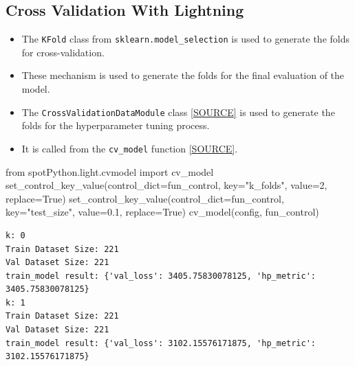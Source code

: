 \documentclass[
  letterpaper,
  DIV=11,
  numbers=noendperiod]{scrreprt}
\newenvironment{Shaded}{\begin{snugshade}}{\end{snugshade}}
\newcommand{\DecValTok}[1]{\textcolor[rgb]{0.68,0.00,0.00}{#1}}
\newcommand{\FloatTok}[1]{\textcolor[rgb]{0.68,0.00,0.00}{#1}}
\newcommand{\ImportTok}[1]{\textcolor[rgb]{0.00,0.46,0.62}{#1}}
\newcommand{\NormalTok}[1]{\textcolor[rgb]{0.00,0.23,0.31}{#1}}
\newcommand{\OperatorTok}[1]{\textcolor[rgb]{0.37,0.37,0.37}{#1}}
\newcommand{\StringTok}[1]{\textcolor[rgb]{0.13,0.47,0.30}{#1}}
\newcommand{\VariableTok}[1]{\textcolor[rgb]{0.07,0.07,0.07}{#1}}
\providecommand{\tightlist}{%
  \setlength{\itemsep}{0pt}\setlength{\parskip}{0pt}}\usepackage{longtable,booktabs,array}
\begin{document}
\subsection{Cross Validation With
Lightning}\label{cross-validation-with-lightning-1}

\begin{itemize}
\tightlist
\item
  The \texttt{KFold} class from \texttt{sklearn.model\_selection} is
  used to generate the folds for cross-validation.
\item
  These mechanism is used to generate the folds for the final evaluation
  of the model.
\item
  The \texttt{CrossValidationDataModule} class
  \href{https://github.com/sequential-parameter-optimization/spotPython/blob/main/src/spotPython/data/lightcrossvalidationdatamodule.py}{{[}SOURCE{]}}
  is used to generate the folds for the hyperparameter tuning process.
\item
  It is called from the \texttt{cv\_model} function
  \href{https://github.com/sequential-parameter-optimization/spotPython/blob/main/src/spotPython/light/cvmodel.py}{{[}SOURCE{]}}.
\end{itemize}

\begin{Shaded}
\begin{Highlighting}[]
\ImportTok{from}\NormalTok{ spotPython.light.cvmodel }\ImportTok{import}\NormalTok{ cv\_model}
\NormalTok{set\_control\_key\_value(control\_dict}\OperatorTok{=}\NormalTok{fun\_control,}
\NormalTok{                        key}\OperatorTok{=}\StringTok{"k\_folds"}\NormalTok{,}
\NormalTok{                        value}\OperatorTok{=}\DecValTok{2}\NormalTok{,}
\NormalTok{                        replace}\OperatorTok{=}\VariableTok{True}\NormalTok{)}
\NormalTok{set\_control\_key\_value(control\_dict}\OperatorTok{=}\NormalTok{fun\_control,}
\NormalTok{                        key}\OperatorTok{=}\StringTok{"test\_size"}\NormalTok{,}
\NormalTok{                        value}\OperatorTok{=}\FloatTok{0.1}\NormalTok{,}
\NormalTok{                        replace}\OperatorTok{=}\VariableTok{True}\NormalTok{)}
\NormalTok{cv\_model(config, fun\_control)}
\end{Highlighting}
\end{Shaded}

\begin{verbatim}
k: 0
Train Dataset Size: 221
Val Dataset Size: 221
train_model result: {'val_loss': 3405.75830078125, 'hp_metric': 3405.75830078125}
k: 1
Train Dataset Size: 221
Val Dataset Size: 221
train_model result: {'val_loss': 3102.15576171875, 'hp_metric': 3102.15576171875}
\end{verbatim}
\end{document}
